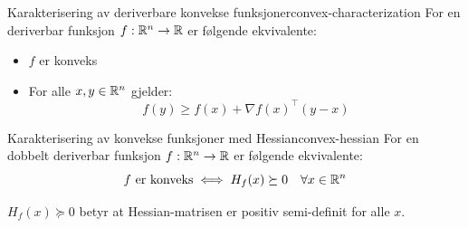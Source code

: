 \begin{theorem}{Karakterisering av deriverbare konvekse funksjoner}{convex-characterization}
  For en deriverbar funksjon  \(f: \mathbb{R}^n \to \mathbb{R}\) er følgende ekvivalente:
  \begin{itemize}
    \item  \(f\) er konveks
    \item For alle  \(x, y \in \mathbb{R}^n\) gjelder:
          \[
            f(y) \geq f(x) + \nabla f(x)^\top (y - x)
          \]
  \end{itemize}
\end{theorem}

\begin{theorem}{Karakterisering av konvekse funksjoner med Hessian}{convex-hessian}
  For en dobbelt deriverbar funksjon  \(f: \mathbb{R}^n \to \mathbb{R}\) er følgende ekvivalente:
  \[
    f \text{ er konveks} \iff H_f(x) \succeq 0 \quad \forall x \in \mathbb{R}^n
  \]

   \(H_f(x) \succeq 0\) betyr at Hessian-matrisen er positiv semi-definit for alle  \(x\).

\end{theorem}

